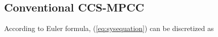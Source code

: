 \documentclass[a4paper, 8pt, twocolumn]{IEEEtran}
\begin{document}

\subsection{Conventional CCS-MPCC}
According to Euler formula, (\ref{eq:sysequation}) can be discretized as
\end{document}
